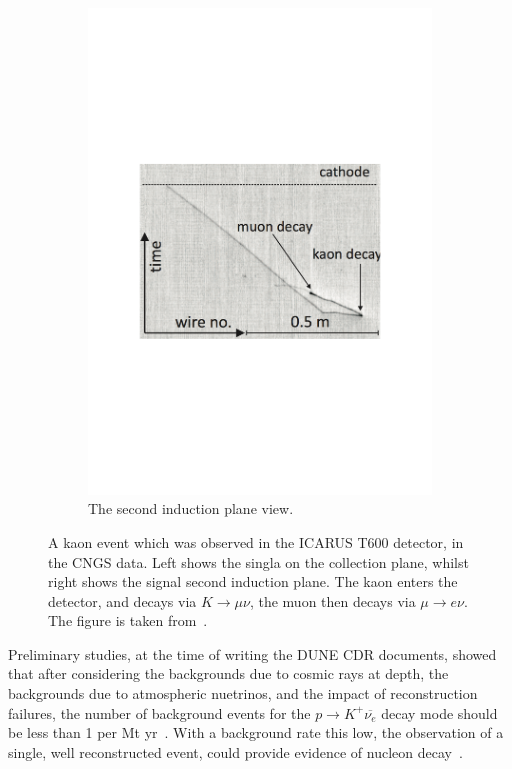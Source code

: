 \begin{figure}
\begin{subfigure}{0.42\textwidth}
    \includegraphics[width=\textwidth]{ICARUSKaon_Ind}
    \caption{The second induction plane view.}
  \end{subfigure}
  \caption[A kaon event which was observed in the ICARUS T600 detector, in the CNGS data]
          {A kaon event which was observed in the ICARUS T600 detector, in the CNGS data. Left shows the singla on the collection plane, whilst right shows the signal second induction plane. The kaon enters the detector, and decays via $K \rightarrow \mu \nu$, the muon then decays via $\mu \rightarrow e \nu$. The figure is taken from~\citep{PMTrack}.}
  \label{fig:ICARUSKaon}
\end{figure}

Preliminary studies, at the time of writing the DUNE CDR documents, showed that after considering the backgrounds due to cosmic rays at depth, the backgrounds due to atmospheric nuetrinos, and the impact of reconstruction failures, the number of background events for the $p \rightarrow K^{+} \overline{\nu_{e}}$ decay mode should be less than 1 per Mt yr~\citep{Klinger:2015kva, Adams:2013qkq, LBNE8836}. With a background rate this low, the observation of a single, well reconstructed event, could provide evidence of nucleon decay~\citep{DUNECDR_V2}. 

